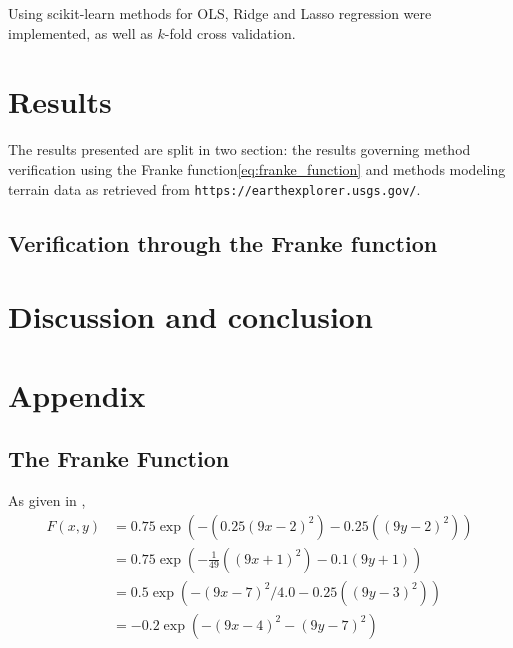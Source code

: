 \documentclass[11pt]{article}
\begin{document}
Using scikit-learn\cite{scikit-learn} methods for OLS, Ridge and Lasso regression were implemented, as well as $k$-fold cross validation.

\section{Results}
The results presented are split in two section: the results governing method verification using the Franke function\eqref{eq:franke_function} and methods modeling terrain data as retrieved from \texttt{https://earthexplorer.usgs.gov/}.

\subsection{Verification through the Franke function}


\section{Discussion and conclusion}

\section{Appendix} \label{sec:appendix}
\subsection{The Franke Function}
As given in \cite{franke1979critical},
\begin{align}
    F(x,y) &= 0.75\exp\left(-\left(0.25\left(9x-2\right)^2\right) - 0.25\left(\left(9y-2\right)^2\right)\right) \\
    &= 0.75\exp\left(-\frac{1}{49}\left(\left(9x+1\right)^2\right) - 0.1\left(9y+1\right)\right) \\
    &= 0.5\exp\left(-\left(9x-7\right)^2/4.0 - 0.25\left(\left(9y-3\right)^2\right)\right) \\
    &= -0.2\exp\left(-\left(9x-4\right)^2 - \left(9y-7\right)^2\right)
    \label{eq:franke_function}
\end{align}



\end{document}
